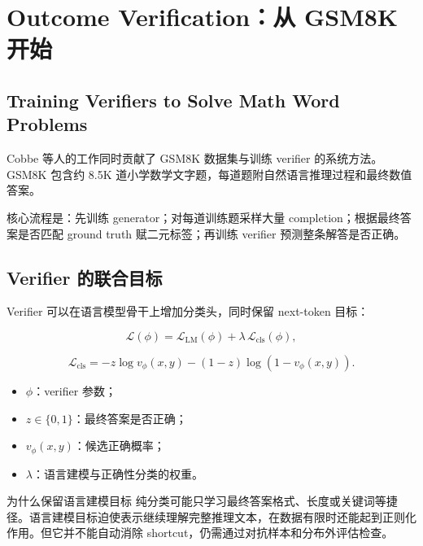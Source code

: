 \section{Outcome Verification：从 GSM8K 开始}

\subsection{Training Verifiers to Solve Math Word Problems}

Cobbe 等人的工作同时贡献了 GSM8K 数据集与训练 verifier 的系统方法。GSM8K 包含约 8.5K 道小学数学文字题，每道题附自然语言推理过程和最终数值答案。


核心流程是：先训练 generator；对每道训练题采样大量 completion；根据最终答案是否匹配 ground truth 赋二元标签；再训练 verifier 预测整条解答是否正确。


\subsection{Verifier 的联合目标}

Verifier 可以在语言模型骨干上增加分类头，同时保留 next-token 目标：

$$
\mathcal L(\phi)
=\mathcal L_{\mathrm{LM}}(\phi)
+\lambda\,\mathcal L_{\mathrm{cls}}(\phi),
$$

$$
\mathcal L_{\mathrm{cls}}
=-z\log v_{\phi}(x,y)-(1-z)\log(1-v_{\phi}(x,y)).
$$

\begin{itemize}
    \item $\phi$：verifier 参数；
    \item $z\in\{0,1\}$：最终答案是否正确；
    \item $v_{\phi}(x,y)$：候选正确概率；
    \item $\lambda$：语言建模与正确性分类的权重。
\end{itemize}


\begin{knowledgebox}{为什么保留语言建模目标}
纯分类可能只学习最终答案格式、长度或关键词等捷径。语言建模目标迫使表示继续理解完整推理文本，在数据有限时还能起到正则化作用。但它并不能自动消除 shortcut，仍需通过对抗样本和分布外评估检查。
\end{knowledgebox}

